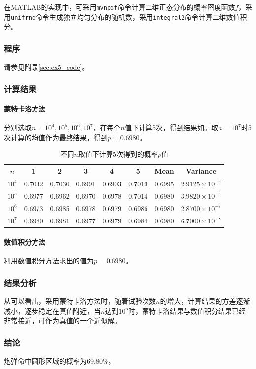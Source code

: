 在MATLAB的实现中，可采用\texttt{mvnpdf}命令计算二维正态分布的概率密度函数$f$，采用\texttt{unifrnd}命令生成独立均匀分布的随机数，采用\texttt{integral2}命令计算二维数值积分。

\subsubsection{程序}

请参见附录\ref{sec:ex5_code}。

\subsubsection{计算结果}

\paragraph{蒙特卡洛方法} 分别选取$n=10^4,10^5,10^6,10^7$，在每个$n$值下计算5次，得到结果如。取$n=10^7$时5次计算的均值作为最终结果，得到$p=0.6980$。

\begin{table}[H]
    \centering
    \caption{不同$n$取值下计算5次得到的概率$p$值}
    \label{tab:ex5_results}
    \begin{tabular}{c|ccccc|cc}
        \toprule
        $n$ & 1 & 2 & 3 & 4 & 5 & Mean & Variance\tabularnewline
        \midrule
        $10^4$ & 0.7032 & 0.7030 & 0.6991 & 0.6903 & 0.7019 & 0.6995 & $2.9125\times 10^{-5}$\tabularnewline
        $10^5$ & 0.6977 & 0.6962 & 0.6970 & 0.6978 & 0.7014 & 0.6980 & $3.9820\times 10^{-6}$\tabularnewline
        $10^6$ & 0.6973 & 0.6985 & 0.6978 & 0.6979 & 0.6986 & 0.6980 & $2.8700\times 10^{-7}$\tabularnewline
        $10^7$ & 0.6980 & 0.6981 & 0.6977 & 0.6979 & 0.6984 & 0.6980 & $6.7000\times 10^{-8}$\tabularnewline
        \bottomrule
    \end{tabular}
\end{table}

\paragraph{数值积分方法} 利用数值积分方法求出的值为$p=0.6980$。

\subsubsection{结果分析}

从可以看出，采用蒙特卡洛方法时，随着试验次数$n$的增大，计算结果的方差逐渐减小，逐步稳定在真值附近，当$n$达到$10^5$时，蒙特卡洛结果与数值积分结果已经非常接近，可作为真值的一个近似解。

\subsubsection{结论}

炮弹命中圆形区域的概率为69.80\%。
